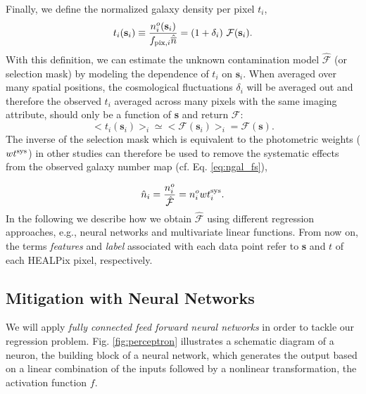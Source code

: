 Finally, we define the normalized galaxy density per pixel $t_{i}$,
\begin{equation}\label{eq:nnbar}
    t_{i}(\textbf{s}_{i}) \equiv \frac{n_{i}^{o}(\textbf{s}_{i})}{f_{{\rm pix},i}\hat{\overline{n}}} = (1+\delta_{i}) ~ \mathcal{F}(\textbf{s}_{i}).
\end{equation}
With this definition, we can estimate the unknown contamination model $\hat{\mathcal{F}}$ (or selection mask) by modeling the dependence of $t_{i}$ on $\textbf{s}_{i}$. When averaged over many spatial positions, the cosmological fluctuations $\delta_i$ will be averaged out and therefore the observed $t_i$ averaged across many pixels with the same imaging attribute, should only be a function of \textbf{s} and return $\mathcal{F}$: %
\begin{equation}\label{eq:tfs}
    <t_{i}(\textbf{s}_{i})>_{i} \simeq <{\mathcal{F}}(\textbf{s}_{i})>_{i} = {\mathcal{F}}(\textbf{s}).
\end{equation}
The inverse of the selection mask which is equivalent to the photometric weights ($wt^{{\rm sys}}$) in other studies can therefore be used to remove the systematic effects from the observed galaxy number map (cf. Eq. \ref{eq:ngal_fs}),

\begin{align}\label{eq:wsys}
\hat{n}_i = \frac{n^o_i}{\hat{\mathcal{F}}}=n^o_i wt^{{\rm sys}}_{i}.
\end{align}
In the following we describe how we obtain $\hat{\mathcal{F}}$ using different regression approaches, e.g., neural networks and multivariate linear functions. From now on, the terms \textit{features} and \textit{label} associated with each data point refer to \textbf{s} and $t$ of each HEALPix pixel, respectively. 

\subsection{Mitigation with Neural Networks}\label{subsec:MethodNN}
We will apply {\it fully connected feed forward neural networks} in order to tackle our regression problem. Fig. \ref{fig:perceptron} illustrates a schematic diagram of a neuron, the building block of a neural network, which generates the output based on a linear combination of the inputs followed by a nonlinear transformation, the activation function $f$.\\

